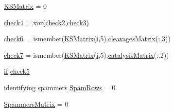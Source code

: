 \begin{DoxyCompactItemize}
\item 
\hyperlink{a00030_aea43faf8d3d68de03c645edc96b0c1c0}{K\-S\-Matrix} = 0
\item 
\hyperlink{a00030_ab21c5bac10f7ac73374c002e908df5ac}{check4} = xor(\hyperlink{a00030_a98a8838a85ed24032563a44271b1525a}{check2},\hyperlink{a00030_adfd17509248a56986475a25ee50fe488}{check3})
\item 
\hyperlink{a00030_a0c9b097ea561ab0f23a69197786a243a}{check6} = ismember(\hyperlink{a00030_ab18f9eabd5f873bd17d226d786bc22df}{K\-S\-Matrix}(\hyperlink{a00071_ad3efca1ea6e3333daf30719ee0501862}{i},5),\hyperlink{a00030_a90d1d83fdcae4fb1cba5129d5820d33c}{cleavages\-Matrix}(\-:,3))
\item 
\hyperlink{a00030_a0bbe7d2ceb7b248f0826d069d5a1b735}{check7} = ismember(\hyperlink{a00030_ab18f9eabd5f873bd17d226d786bc22df}{K\-S\-Matrix}(\hyperlink{a00071_ad3efca1ea6e3333daf30719ee0501862}{i},5),\hyperlink{a00030_a244eec8903103b5bbddef461276286ce}{catalysis\-Matrix}(\-:,2))
\item 
\hyperlink{a00030_a01d55766b8058903dd360b4bda71f9f5}{if} \hyperlink{a00030_abee07c73829351d18ba356c86e3e096d}{check5}
\item 
identifying spammers \hyperlink{a00030_aa9cffa4c2d9962c67a719b05a414e478}{Spam\-Rows} = 0
\item 
\hyperlink{a00030_af1801174c9397e7fad0394203f120c31}{Spammers\-Matrix} = 0
\end{DoxyCompactItemize}


